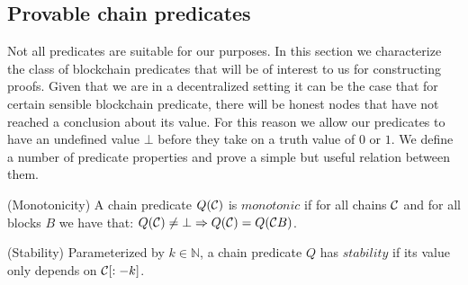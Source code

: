 \subsection{Provable chain predicates}

Not all predicates are suitable for our purposes. In this section we characterize the class of
blockchain predicates that will be of interest to us for constructing proofs.
Given that we are in a decentralized setting it can be the case that for certain
sensible blockchain predicate, there will be honest nodes that have not reached
a conclusion about its value. For this reason we allow our predicates to have an
undefined value $\bot$ before they take on a truth value of $0$ or $1$. We
define a number of predicate properties and prove a simple but useful relation
between them.

\begin{definition}{(Monotonicity)}
    A chain predicate $Q(\mathcal{C})$ is $\textit{monotonic}$ if for all chains
    $\mathcal{C}$ and for all blocks $B$ we have that:
    $Q(\mathcal{C}) \neq \bot \Rightarrow Q(\mathcal{C}) = Q(\mathcal{C} B)$.

\noindent
 {(Stability)}
    Parameterized by $k \in \mathbb{N}$, a chain predicate
    $Q$ has $\textit{stability}$ if its value only depends on $\mathcal{C}[:-k]$.

\end{definition}
%
